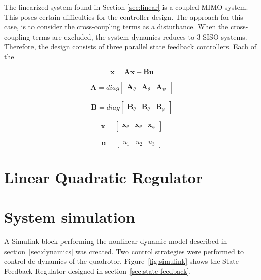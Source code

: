 \documentclass[12pt]{article}
\begin{document}
The linearized system found in Section \ref{sec:linear} is a coupled MIMO system. This poses certain difficulties for the controller design. The approach for this case, is to consider the cross-coupling terms as a disturbance. When the cross-coupling terms are excluded, the system dynamics reduces to 3 SISO systems. Therefore, the design consists of three parallel state feedback controllers. Each of the 

\begin{equation}
\dot{\mathbf{x}} = \mathbf{A} \mathbf{x} + \mathbf{B} \mathbf{u}
\end{equation}

\begin{equation}
\mathbf{A} = diag\begin{bmatrix} \mathbf{A}_\theta & \mathbf{A}_\theta & \mathbf{A}_\psi \end{bmatrix}
\end{equation}

\begin{equation}
\mathbf{B} = diag\begin{bmatrix} \mathbf{B}_\theta & \mathbf{B}_\theta & \mathbf{B}_\psi \end{bmatrix}
\end{equation}

\begin{equation}
\mathbf{x} = \begin{bmatrix} \mathbf{x}_\theta & \mathbf{x}_\theta & \mathbf{x}_\psi \end{bmatrix}
\end{equation}

\begin{equation}
\mathbf{u} = \begin{bmatrix} u_1 & u_2 & u_3 \end{bmatrix}
\end{equation}

\section{Linear Quadratic Regulator}

\section{System simulation}
A Simulink block performing the nonlinear dynamic model described in section~\ref{sec:dynamics} was created. Two control strategies were performed to control de dynamics of the quadrotor. Figure~\ref{fig:simulink} shows the State Feedback Regulator designed in section~\ref{sec:state-feedback}.
\end{document}

